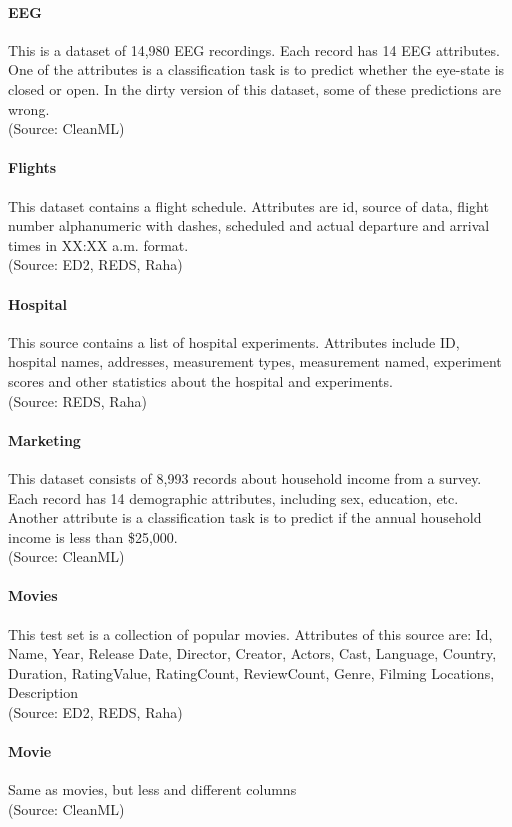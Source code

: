 \paragraph{EEG}
This is a dataset of 14,980 EEG recordings. Each record has 14 EEG attributes. One of the attributes is a classification task is to predict whether the eye-state is closed or open. In the dirty version of this dataset, some of these predictions are wrong.
\\(Source: CleanML)

\paragraph{Flights}
This dataset contains a flight schedule. Attributes are id, source of data, flight number alphanumeric with dashes, scheduled and actual departure and arrival times in XX:XX a.m. format.
\\(Source: ED2, REDS, Raha)

\paragraph{Hospital}
This source contains a list of hospital experiments. Attributes include ID, hospital names, addresses, measurement types, measurement named, experiment scores and other statistics about the hospital and experiments.
\\(Source: REDS, Raha)

\paragraph{Marketing}
This dataset consists of 8,993 records about household income from a survey. Each record has 14 demographic attributes, including sex, education, etc. Another attribute is a classification task is to predict if the annual household income is less than \$25,000.
\\(Source: CleanML)

\paragraph{Movies}
This test set is a collection of popular movies. Attributes of this source are:
Id, Name, Year, Release Date, Director, Creator, Actors, Cast, Language, Country, Duration, RatingValue, RatingCount, ReviewCount, Genre, Filming Locations, Description
\\(Source: ED2, REDS, Raha)

\paragraph{Movie}
Same as movies, but less and different columns
\\(Source: CleanML)

